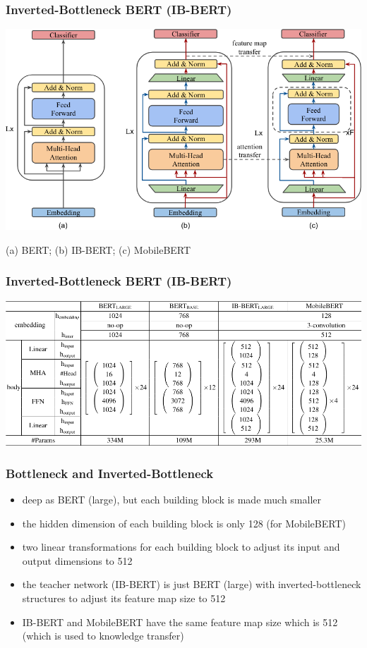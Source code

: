 \documentclass{beamer}
\begin{document}
\begin{frame}
    \frametitle{Inverted-Bottleneck BERT (IB-BERT)}
    \begin{center}
        \includegraphics[scale=0.32]{img/mobile_bert_model.png}
    \end{center}
    (a) BERT; (b) IB-BERT; (c) MobileBERT
\end{frame}

\begin{frame}
    \frametitle{Inverted-Bottleneck BERT (IB-BERT)}
    \begin{center}
        \includegraphics[scale=0.3]{img/mobile_bert_sizes.png}
    \end{center}
\end{frame}

\begin{frame}
    \frametitle{Bottleneck and Inverted-Bottleneck}
    \begin{itemize}
        \item deep as BERT (large), but each building block is made much smaller
        \item the hidden dimension of each building block is only 128 (for MobileBERT)
        \item two linear transformations for each building block to adjust its input and output dimensions to 512
        \item the teacher network (IB-BERT) is just BERT (large) with inverted-bottleneck structures to adjust its feature map size to 512
        \item IB-BERT and MobileBERT have the same feature map size which is 512 (which is used to knowledge transfer)
    \end{itemize}
\end{frame}
\end{document}
